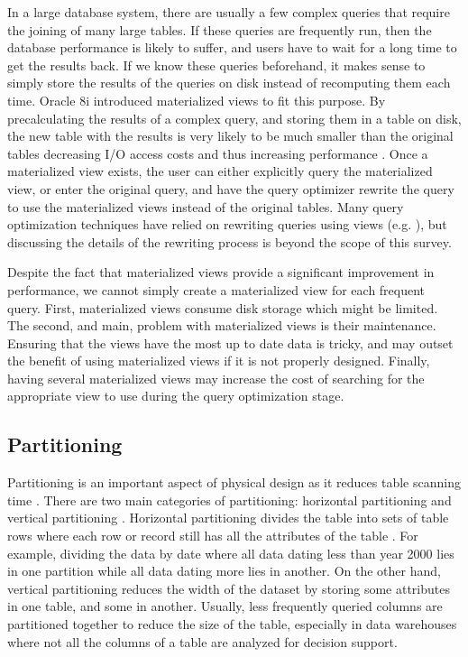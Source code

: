 \documentclass[12pt,a4paper]{article}
\begin{document}
In a large database system, there are usually a few complex queries that require the joining of many large tables. If these queries are frequently run, then the
database performance is likely to suffer, and users have to wait for a long time to get the results back. If we know these queries beforehand, it makes sense to
simply store the results of the queries on disk instead of recomputing them each time. Oracle 8i introduced materialized views to fit this purpose. By
precalculating the results of a complex query, and storing them in a table on disk, the new table with the results is very likely to be much smaller than the
original tables decreasing I/O access costs and thus increasing performance \cite{lightstone2007physical, chaudhuri1998overview}. Once a materialized view
exists, the user can either explicitly query the materialized view, or enter the original query, and have the query optimizer rewrite the query to use the
materialized views instead of the original tables. Many query optimization techniques have relied on rewriting queries using views (e.g.
\cite{levy1995answering, gupta1995aggregate, goldstein2001optimizing, abiteboul1998complexity}), but discussing the details of the rewriting process is beyond
the scope of this survey.

Despite the fact that materialized views provide a significant improvement in performance, we cannot simply create a materialized view for each frequent query.
First, materialized views consume disk storage which might be limited. The second, and main, problem with materialized views is their maintenance. Ensuring that
the views have the most up to date data is tricky, and may outset the benefit of using materialized views if it is not properly designed. Finally, having
several materialized views may increase the cost of searching for the appropriate view to use during the query optimization stage.

\subsection{Partitioning}

Partitioning is an important aspect of physical design as it reduces table scanning time \cite{lightstone2007physical}. There are two main categories of
partitioning: horizontal partitioning and vertical partitioning \cite{agrawal2004integrating}. Horizontal partitioning divides the table into sets of table rows
where each row or record still has all the attributes of the table \cite{ceri1982horizontal, shin1985partitioning}. For example, dividing the data by date where
all data dating less than year 2000 lies in one partition while all data dating more lies in another. On the other hand, vertical partitioning reduces the width
of the dataset by storing some attributes in one table, and some in another. Usually, less frequently queried columns are partitioned together to reduce the
size of the table, especially in data warehouses where not all the columns of a table are analyzed for decision support.
\end{document}
